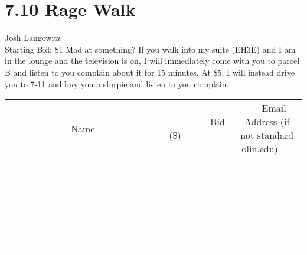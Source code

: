 \documentclass[11pt]{article}
\begin{document}
\section*{7.10 Rage Walk}
Josh Langowitz
\\
Starting Bid: \$1
\newline
Mad at something? If you walk into my suite (EH3E) and I am in the lounge and the television is on, I will immediately come with you to parcel B and listen to you complain about it for 15 minutes. At \$5, I will instead drive you to 7-11 and buy you a slurpie and listen to you complain.
\\[6ex]
\begin{tabular}{c c c}
~~~~~~~~~~~~~Name~~~~~~~~~~~~~ & ~~~~~~~~~Bid (\$)~~~~~~~~~  & ~~~Email Address (if not standard olin.edu)~~~\\
 & & \\
\hline
 & & \\
\hline
 & & \\
\hline
 & & \\
\hline
 & & \\
\hline
 & & \\
\hline
 & & \\
\hline
 & & \\
\hline
 & & \\
\hline
 & & \\
\hline
 & & \\
\hline
 & & \\
\hline
 & & \\
\hline
 & & \\
\hline
 & & \\
\hline
 & & \\
\hline
 & & \\
\hline
 & & \\
\hline
 & & \\
\hline
 & & \\
\hline
 & & \\
\hline
 & & \\
\hline
 & & \\
\hline
 & & \\
\hline
 & & \\
\hline
 & & \\
\hline
\end{tabular}
\newpage
\end{document}
